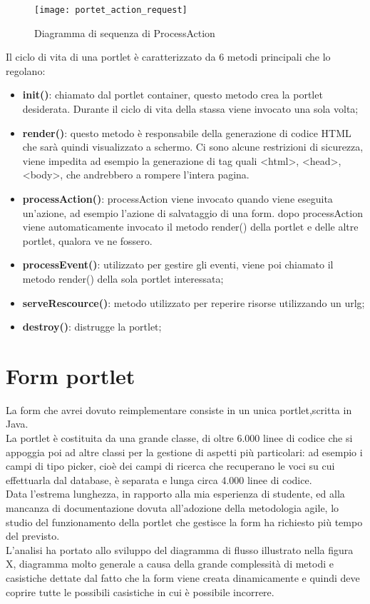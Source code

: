 \begin{figure}[h]
	\centering
	\texttt{[image: portet\_action\_request]}
	\caption{Diagramma di sequenza di ProcessAction}
	\label{process-action}
\end{figure}

Il ciclo di vita di una \gls{portlet} è caratterizzato da 6 metodi principali che lo regolano:
\begin{itemize}
	\item \textbf{init()}: chiamato dal portlet container, questo metodo crea la \gls{portlet} desiderata. Durante il ciclo di vita della stassa viene invocato una sola volta;
	\item \textbf{render()}: questo metodo è responsabile della generazione di codice HTML che sarà quindi visualizzato a schermo. Ci sono alcune restrizioni di sicurezza, viene impedita ad esempio la generazione di tag quali <html>, <head>, <body>, che andrebbero a rompere l'intera pagina.
	\item \textbf{processAction()}: processAction viene invocato quando viene eseguita un'azione, ad esempio l'azione di salvataggio di una form. dopo processAction viene automaticamente invocato il metodo render() della portlet e delle altre \gls{portlet}, qualora ve ne fossero.
	\item \textbf{processEvent()}: utilizzato per gestire gli eventi, viene poi chiamato il metodo render() della sola \gls{portlet} interessata;
	\item \textbf{serveRescource()}: metodo utilizzato per reperire risorse utilizzando un \gls{urlg};
	\item \textbf{destroy()}: distrugge la \gls{portlet};
\end{itemize}	

\section{Form portlet}
La form che avrei dovuto reimplementare consiste in un unica portlet,scritta in Java. \\
La portlet è costituita da una grande classe, di oltre 6.000 linee di codice che si appoggia poi ad altre classi per la gestione di aspetti più particolari: ad esempio i campi di tipo picker, cioè dei campi di ricerca che recuperano le voci su cui effettuarla dal database, è separata e lunga circa 4.000 linee di codice.\\
Data l'estrema lunghezza, in rapporto alla mia esperienza di studente, ed alla mancanza di documentazione dovuta all'adozione della metodologia agile, lo studio del funzionamento della portlet che gestisce la form ha richiesto più tempo del previsto. \\ 
L'analisi ha portato allo sviluppo del diagramma di flusso illustrato nella figura X, diagramma molto generale a causa della grande complessità di metodi e casistiche dettate dal fatto che la form viene creata dinamicamente e quindi deve coprire tutte le possibili casistiche in cui è possibile incorrere.\\	